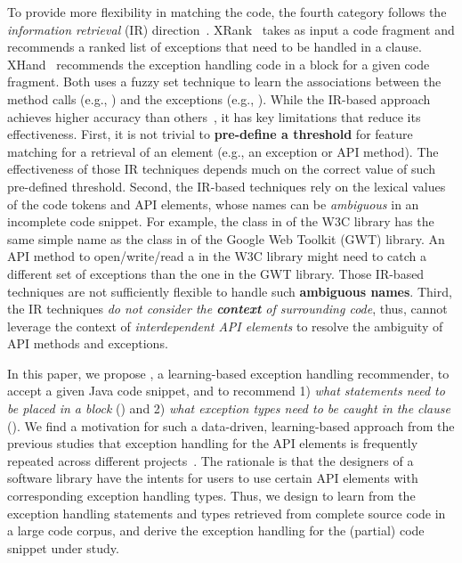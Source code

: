 To provide more flexibility in matching the code, the fourth category
follows the {\em information retrieval} (IR)
direction~\cite{xrank-fse20}. XRank~\cite{xrank-fse20} takes as input
a code fragment and recommends a ranked list of exceptions that need
to be handled in a  clause. XHand~\cite{xrank-fse20}
recommends the exception handling code in a  block for a
given code fragment. Both uses a fuzzy set technique to learn the
associations between the method calls (e.g.,
) and the exceptions (e.g.,
). While the IR-based approach achieves higher
accuracy than others~\cite{xrank-fse20}, it has key limitations that
reduce its effectiveness. First, it is not trivial to {\bf pre-define
  a threshold} for feature matching for a retrieval of an element
(e.g., an exception or API method). The effectiveness of those IR
techniques depends much on the correct value of such pre-defined
threshold. Second, the IR-based techniques rely on the lexical values
of the code tokens and API elements, whose names can be {\em
  ambiguous} in an incomplete code snippet. For example, the
 class in  of the W3C library has
the same simple name as the  class in
 of the Google Web
Toolkit (GWT) library. An API method to open/write/read a
 in the W3C library might need to catch a different set
of exceptions than the one in the GWT library. Those IR-based
techniques are not sufficiently flexible to handle such {\bf ambiguous
  names}. Third, the IR techniques {\em do not consider the {\bf
    context} of surrounding code}, thus, cannot leverage the context
of {\em interdependent API elements} to resolve the ambiguity of API
methods and exceptions.

In this paper, we propose {\tool}, a learning-based exception handling
recommender, to accept a given Java code snippet, and to recommend
1) {\em what statements need to be placed in a  block}
({\xstate}) and 2) {\em what exception types need to be
  caught in the  clause} ({\xtype}).  We find a motivation
for such a data-driven, learning-based approach from the previous
studies that exception handling for the API elements is frequently
repeated across different
projects~\cite{chanchal-scam14,zhong-jss18}. The rationale is that the
designers of a software library have the intents for users to use
certain API elements with corresponding exception handling types.
Thus, we design {\tool} to learn from the exception handling
statements and types retrieved from complete source code in a large
code corpus, and derive the exception handling for the (partial) code
snippet under study.

